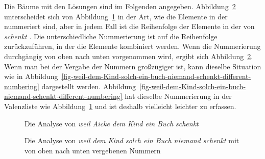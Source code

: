 \begin{enumerate}
Die Bäume mit den Lösungen sind im
Folgenden angegeben. Abbildung~\ref{fig-weil-dem-Kind-solch-ein-buch-niemand-schenkt} unterscheidet sich von
Abbildung~\ref{fig-weil-Aicke-dem-Kind-ein-buch-schenkt} in der Art, wie die Elemente in der \compsl
nummeriert sind, aber in jedem Fall ist die Reihenfolge der Elemente in der \compsl von \emph{schenkt}
\sliste{ \npnom, \npdat, \npacc{} }. Die unterschiedliche Nummerierung ist auf die Reihenfolge zurückzuführen, in der
die Elemente kombiniert werden. Wenn die Nummerierung durchgängig von oben nach unten vorgenommen wird, ergibt sich
Abbildung~\ref{fig-weil-dem-Kind-solch-ein-buch-niemand-schenkt}. Wenn man bei der Vergabe der Nummern großzügiger
ist, kann dieselbe Situation wie in
Abbildung~\ref{fig-weil-dem-Kind-solch-ein-buch-niemand-schenkt-different-numbering} dargestellt werden. Abbildung~\ref{fig-weil-dem-Kind-solch-ein-buch-niemand-schenkt-different-numbering}
hat dieselbe Nummerierung in der Valenzliste wie Abbildung~\ref{fig-weil-Aicke-dem-Kind-ein-buch-schenkt}
und ist deshalb vielleicht leichter zu erfassen.

\begin{figure}
\caption{\label{fig-weil-Aicke-dem-Kind-ein-buch-schenkt}Die Analyse von \emph{weil Aicke dem Kind
    ein Buch schenkt}}
\end{figure}

\begin{figure}
\caption{\label{fig-weil-dem-Kind-solch-ein-buch-niemand-schenkt}Die Analyse von \emph{weil dem Kind
    solch ein Buch niemand schenkt} mit von oben nach unten vergebenen Nummern}
\end{figure}


\end{enumerate}
